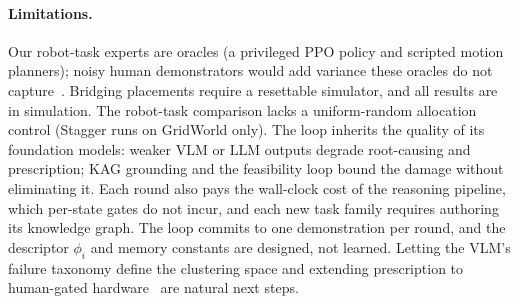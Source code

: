 \documentclass[letterpaper]{article} %
\begin{document}
\paragraph{Limitations.}
Our robot-task experts are oracles (a privileged PPO policy and scripted
motion planners); noisy human demonstrators would add variance these
oracles do not capture~\citep{mandlekar2020iwr,liu2023sirius}. Bridging placements require
a resettable simulator, and all results are in simulation. The robot-task
comparison lacks a uniform-random allocation control (Stagger runs on
GridWorld only). The loop inherits
the quality of its foundation models: weaker VLM or LLM outputs degrade
root-causing and prescription; KAG grounding and the feasibility loop
bound the damage without eliminating it. Each round also pays the
wall-clock cost of the reasoning pipeline, which per-state gates do not
incur, and each new task family requires authoring its knowledge graph. The loop
commits to one demonstration per round, and the descriptor $\phi_i$ and
memory constants are designed, not learned. Letting
the VLM's failure taxonomy define the clustering space and extending
prescription to human-gated hardware~\citep{kelly2019hgdagger} are natural
next steps.



\end{document}
